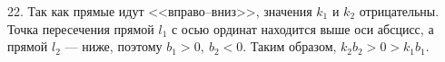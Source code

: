 22. Так как прямые идут <<вправо--вниз>>, значения $k_1$ и $k_2$ отрицательны. Точка пересечения прямой $l_1$ с осью ординат находится выше оси абсцисс, а прямой $l_2$ --- ниже, поэтому $b_1>0,\ b_2<0.$ Таким образом, $k_2b_2>0>k_1b_1.$\\
